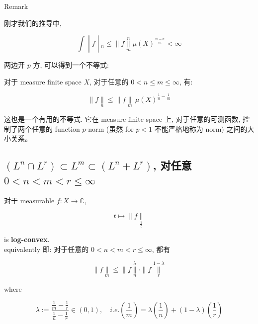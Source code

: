 \documentclass{qlnotes-export}
\begin{document}
\begin{qlremark}{Remark}

刚才我们的推导中,

\[\left. \int \middle| f \middle| {}_{n} \leq \parallel f\underset{m}{\overset{n}{\parallel}}\mu(X)^{\frac{m - n}{m}} < \infty \right.\]

两边开 \(p\) 方, 可以得到一个不等式:

\begin{theorem}

对于 measure finite space \(X\), 对于任意的 \(0 < n \leq m \leq \infty\), 有:

\[\parallel f\underset{n}{\parallel} \leq \parallel f\underset{m}{\parallel}\,\mu(X)^{\frac{1}{n} - \frac{1}{m}}\]

\end{theorem}

这也是一个有用的不等式. 它在 measure finite space 上, 对于任意的可测函数, 控制了两个任意的 function \(p\)-norm (虽然 for \(p < 1\) 不能严格地称为 norm) 之间的大小关系。

\end{qlremark}

\subsection{\texorpdfstring{\((L^{n} \cap L^{r}) \subset L^{m} \subset (L^{n} + L^{r})\), 对任意 \(0 < n < m < r \leq \infty\)}{(L\^{}\{n\} \textbackslash cap L\^{}\{r\}) \textbackslash subset L\^{}\{m\} \textbackslash subset (L\^{}\{n\} + L\^{}\{r\}), 对任意 0 \textless{} n \textless{} m \textless{} r \textbackslash leq \textbackslash infty}}\label{ln-cap-lr-subset-lm-subset-ln-lr-ux5bf9ux4efbux610f-0-n-m-r-leq-infty}

\begin{proposition}

对于 measurable \(f:X\rightarrow{\mathbb{C}}\),

\[t\mapsto \parallel f\underset{\frac{1}{t}}{\parallel}\]

is \textbf{log-convex}.\\
equivalently 即: 对于任意的 \(0 < n < m < r \leq \infty\), 都有

\[\parallel f\underset{m}{\parallel} \leq \parallel f\underset{n}{\overset{\lambda}{\parallel}} \cdot \parallel f\underset{r}{\overset{1 - \lambda}{\parallel}}\]

where

\[\lambda := \frac{\frac{1}{m} - \frac{1}{r}}{\frac{1}{n} - \frac{1}{r}} \in (0,1),\quad i.e.(\frac{1}{m}) = \lambda(\frac{1}{n}) + (1 - \lambda)(\frac{1}{r})\]

\end{proposition}
\end{document}
